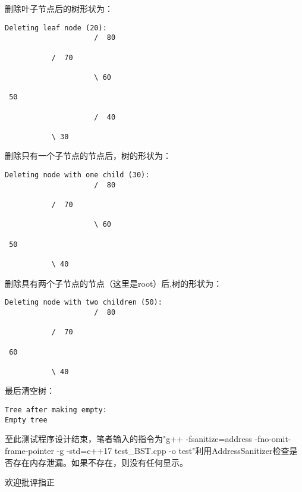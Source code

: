 \documentclass[fontset=fandol]{ctexart}
\begin{document}
删除叶子节点后的树形状为：
\begin{verbatim}  
Deleting leaf node (20): 
                     /  80

           /  70

                     \ 60

 50

                     /  40

           \ 30
\end{verbatim}
删除只有一个子节点的节点后，树的形状为：
\begin{verbatim}  
Deleting node with one child (30): 
                     /  80

           /  70

                     \ 60

 50

           \ 40
\end{verbatim}
删除具有两个子节点的节点（这里是root）后,树的形状为：
\begin{verbatim}  
Deleting node with two children (50): 
                     /  80

           /  70

 60

           \ 40
\end{verbatim}
最后清空树：
\begin{verbatim}  
Tree after making empty:
Empty tree
\end{verbatim}

至此测试程序设计结束，笔者输入的指令为"g++ -fsanitize=address -fno-omit-frame-pointer -g -std=c++17 test\_BST.cpp -o test"利用AddressSanitizer检查是否存在内存泄漏。如果不存在，则没有任何显示。

欢迎批评指正
\end{document}
